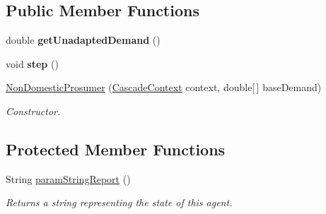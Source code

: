 \subsection*{Public Member Functions}
\begin{DoxyCompactItemize}
\item 
\hypertarget{classuk_1_1ac_1_1dmu_1_1iesd_1_1cascade_1_1agents_1_1prosumers_1_1_non_domestic_prosumer_ae74651074b50a89e44cf2824c23ab70d}{double {\bfseries get\-Unadapted\-Demand} ()}\label{classuk_1_1ac_1_1dmu_1_1iesd_1_1cascade_1_1agents_1_1prosumers_1_1_non_domestic_prosumer_ae74651074b50a89e44cf2824c23ab70d}

\item 
\hypertarget{classuk_1_1ac_1_1dmu_1_1iesd_1_1cascade_1_1agents_1_1prosumers_1_1_non_domestic_prosumer_aef2375dba5f59bee0e46ef4a9a1f507a}{void {\bfseries step} ()}\label{classuk_1_1ac_1_1dmu_1_1iesd_1_1cascade_1_1agents_1_1prosumers_1_1_non_domestic_prosumer_aef2375dba5f59bee0e46ef4a9a1f507a}

\item 
\hypertarget{classuk_1_1ac_1_1dmu_1_1iesd_1_1cascade_1_1agents_1_1prosumers_1_1_non_domestic_prosumer_abd3a954225d1d644fe9d197ef0aea21c}{\hyperlink{classuk_1_1ac_1_1dmu_1_1iesd_1_1cascade_1_1agents_1_1prosumers_1_1_non_domestic_prosumer_abd3a954225d1d644fe9d197ef0aea21c}{Non\-Domestic\-Prosumer} (\hyperlink{classuk_1_1ac_1_1dmu_1_1iesd_1_1cascade_1_1context_1_1_cascade_context}{Cascade\-Context} context, double\mbox{[}$\,$\mbox{]} base\-Demand)}\label{classuk_1_1ac_1_1dmu_1_1iesd_1_1cascade_1_1agents_1_1prosumers_1_1_non_domestic_prosumer_abd3a954225d1d644fe9d197ef0aea21c}

\begin{DoxyCompactList}\small\item\em Constructor. \end{DoxyCompactList}\end{DoxyCompactItemize}
\subsection*{Protected Member Functions}
\begin{DoxyCompactItemize}
\item 
String \hyperlink{classuk_1_1ac_1_1dmu_1_1iesd_1_1cascade_1_1agents_1_1prosumers_1_1_non_domestic_prosumer_a12e507be93c129dc612fb56c86e16ca0}{param\-String\-Report} ()
\begin{DoxyCompactList}\small\item\em Returns a string representing the state of this agent. \end{DoxyCompactList}\end{DoxyCompactItemize}
